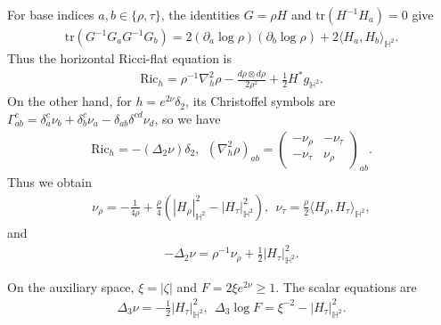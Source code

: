 \documentclass[letterpaper]{amsart}
\theoremstyle{definition}
\theoremstyle{remark}
\begin{document}
For base indices $a,b\in\{\rho,\tau\}$, the identities $G=\rho H$ and $\mathrm{tr}(H^{-1}H_a)=0$ give
\begin{align*}
	\mathrm{tr}\left( G ^{-1} G_{a} G ^{-1} G_{b} \right) = 2 (\partial _{a} \log \rho ) (\partial _{b} \log \rho ) +2\langle H_a,H_b\rangle_{\mathbb H^2}. 
\end{align*} 
Thus the horizontal Ricci-flat equation is
\begin{align*}
	\mathrm{Ric}_{h} = \rho ^{-1} \nabla ^2_h \rho - \frac{d \rho \otimes d \rho }{2 \rho ^2} + \frac{1}{2} H ^{*} g_{\mathbb{H}^2}.
\end{align*} 
On the other hand, for $h = e ^{2 \nu } \delta _{2}$, its Christoffel symbols are $\Gamma ^{c}_{a b} = \delta _{a}^{c} \nu _b + \delta ^{c}_{b} \nu _{a} - \delta _{a b} \delta ^{c d} \nu _{d}$, so we have
\begin{align*}
	\mathrm{Ric}_h = - (\Delta _{2} \nu ) \delta _2,\ \ (\nabla ^2_h \rho )_{ab} = \begin{pmatrix} - \nu _{\rho } & - \nu _{\tau } \\ - \nu _{\tau } & \nu _{\rho } \end{pmatrix} _{a b}.
\end{align*} 
Thus we obtain
\begin{align*}
	\nu _{\rho } = - \frac{1}{4 \rho } + \frac{\rho }{4} \left( |H_{\rho }|^2_{\mathbb{H}^2} - |H_{\tau }|^2_{\mathbb{H}^2} \right) ,\ \ \nu _{\tau } = \frac{\rho }{2} \langle H_{\rho }, H_{\tau } \rangle_{\mathbb{H}^2},
\end{align*} 
and
\begin{align*}
	-\Delta _2 \nu  = \rho ^{-1} \nu _{\rho } + \frac{1}{2} |H_{\tau }|^2_{\mathbb{H}^2}.
\end{align*} 

On the auxiliary space, $\xi=|\zeta|$ and $F=2\xi e^{2\nu}\ge1$. The scalar equations are
\begin{align*}
	\Delta _{3} \nu = -\frac{1}{2} |H_{\tau }|^2_{\mathbb{H}^2},\ \ \Delta _{3} \log F= \xi ^{-2} - |H_{\tau }|^2_{\mathbb{H}^2}.
\end{align*} 
\end{document}
